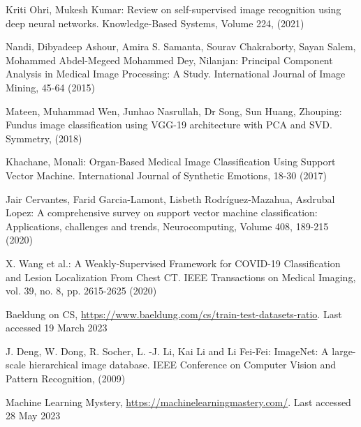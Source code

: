 \begin{thebibliography}{99.}
Kriti Ohri, Mukesh Kumar: Review on self-supervised image recognition using deep neural networks. Knowledge-Based Systems, Volume 224, (2021)

Nandi, Dibyadeep Ashour, Amira S. Samanta, Sourav Chakraborty, Sayan Salem, Mohammed Abdel-Megeed Mohammed Dey, Nilanjan: Principal Component Analysis in Medical Image Processing: A Study. International Journal of Image Mining, 45-64 (2015)

Mateen, Muhammad Wen, Junhao Nasrullah, Dr Song, Sun Huang, Zhouping: Fundus image classification using VGG-19 architecture with PCA and SVD. Symmetry, (2018)

Khachane, Monali: Organ-Based Medical Image Classification Using Support Vector Machine. International Journal of Synthetic Emotions, 18-30 (2017)

Jair Cervantes, Farid Garcia-Lamont, Lisbeth Rodríguez-Mazahua, Asdrubal Lopez: A comprehensive survey on support vector machine classification: Applications, challenges and trends,
Neurocomputing, Volume 408, 189-215 (2020)

X. Wang et al.: A Weakly-Supervised Framework for COVID-19 Classification and Lesion Localization From Chest CT. IEEE Transactions on Medical Imaging, vol. 39, no. 8, pp. 2615-2625 (2020)

Baeldung on CS, \url{https://www.baeldung.com/cs/train-test-datasets-ratio}. Last accessed 19
March 2023

J. Deng, W. Dong, R. Socher, L. -J. Li, Kai Li and Li Fei-Fei: ImageNet: A large-scale hierarchical image database. IEEE Conference on Computer Vision and Pattern Recognition, (2009)

Machine Learning Mystery, \url{https://machinelearningmastery.com/}. Last accessed 28
May 2023

\end{thebibliography}